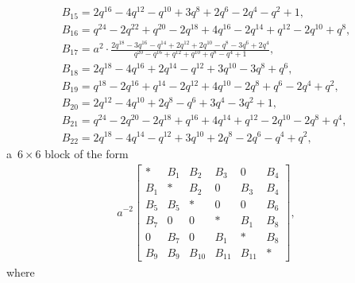 \documentclass[10pt,a4paper]{amsart}
\numberwithin{equation}{section}
\theoremstyle{definition}
\newcommand{\flac}[2]{#1}
\begin{document}
\begin{gather*}
 B_{15} =
\flac{2q^{16}}{a^2}-\flac{4q^{12}}{a^2}-\flac{q^{10}}{a^2}+\flac{3q^{8}}{a^2}+\flac{2q^{6}}{a^2}-\flac{2q^{4}}{a^2}-\flac{q^{2}}{a^2}+\flac{1}{a^2}, \\
 B_{16} =
\flac{q^{24}}{a^2}-\flac{2q^{22}}{a^2}+\flac{q^{20}}{a^2}-\flac{2q^{18}}{a^2}+\flac{4q^{16}}{a^2}-\flac{2q^{14}}{a^2}+\flac{q^{12}}{a^2}-\flac{2q^{10}}{a^2}+\flac{q^{8}}{a^2}, \\
 B_{17} =
a^2 \cdot \frac{2q^{18}-3q^{16}-q^{14}+2q^{12}+2q^{10}-q^{8}-3q^{6}+2q^{4}}{q^{20}-q^{16}+q^{12}+q^{10}+q^{8}-q^{4}+1},\\
 B_{18} =
\flac{2q^{18}}{a^2}-\flac{4q^{16}}{a^2}+\flac{2q^{14}}{a^2}-\flac{q^{12}}{a^2}+\flac{3q^{10}}{a^2}-\flac{3q^{8}}{a^2}+\flac{q^{6}}{a^2}, \\
 B_{19} =
\flac{q^{18}}{a^2}-\flac{2q^{16}}{a^2}+\flac{q^{14}}{a^2}-\flac{2q^{12}}{a^2}+\flac{4q^{10}}{a^2}-\flac{2q^{8}}{a^2}+\flac{q^{6}}{a^2}-\flac{2q^{4}}{a^2}+\flac{q^{2}}{a^2}, \\
 B_{20} =
\flac{2q^{12}}{a^2}-\flac{4q^{10}}{a^2}+\flac{2q^{8}}{a^2}-\flac{q^{6}}{a^2}+\flac{3q^{4}}{a^2}-\flac{3q^{2}}{a^2}+\flac{1}{a^2}, \\
 B_{21} =
\flac{q^{24}}{a^2}-\flac{2q^{20}}{a^2}-\flac{2q^{18}}{a^2}+\flac{q^{16}}{a^2}+\flac{4q^{14}}{a^2}+\flac{q^{12}}{a^2}-\flac{2q^{10}}{a^2}-\flac{2q^{8}}{a^2}+\flac{q^{4}}{a^2}, \\
 B_{22} =
\flac{2q^{18}}{a^2}-\flac{4q^{14}}{a^2}-\flac{q^{12}}{a^2}+\flac{3q^{10}}{a^2}+\flac{2q^{8}}{a^2}-\flac{2q^{6}}{a^2}-\flac{q^{4}}{a^2}+\flac{q^{2}}{a^2},
\end{gather*}
a~$6 \times 6$ block of the form
\begin{align*}
 a^{-2}\begin{bmatrix}
 * & B_1 & B_2 & B_3 & 0 & B_4 \\
 B_1 & * & B_2 & 0 & B_3 & B_4 \\
 B_5 & B_5 & * & 0 & 0 & B_6 \\
 B_7 & 0 & 0 & * & B_1 & B_8 \\
 0 & B_7 & 0 & B_1 & * & B_8 \\
 B_9 & B_9 & B_{10} & B_{11} & B_{11} & *
 \end{bmatrix},
\end{align*}
where
\end{document}
